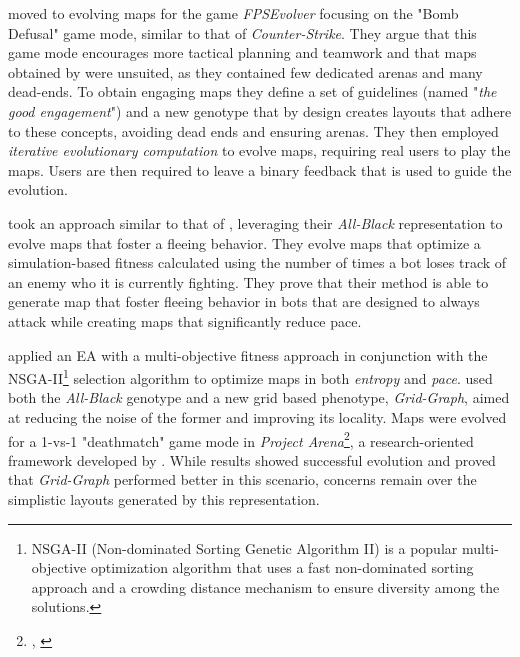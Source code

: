 \documentclass{Configuration_Files/PoliMi3i_thesis}
\begin{document}
 moved to evolving maps for the game \textit{FPSEvolver} focusing on the "Bomb Defusal" game mode, similar to that of \textit{Counter-Strike}. They argue that this game mode encourages more tactical planning and teamwork and that maps obtained by  were unsuited, as they contained few dedicated arenas and many dead-ends. To obtain engaging maps they define a set of guidelines (named "\textit{the good engagement}") and a new genotype that by design creates layouts that adhere to these concepts, avoiding dead ends and ensuring arenas. They then employed \textit{iterative evolutionary computation} to evolve maps, requiring real users to play the maps. Users are then required to leave a binary feedback that is used to guide the evolution. \cite{olsted_interactive_2015}

 took an approach similar to that of , leveraging their \textit{All-Black} representation to evolve maps that foster a fleeing behavior. They evolve maps that optimize a simulation-based fitness calculated using the number of times a bot loses track of an enemy who it is currently fighting. They prove that their method is able to generate map that foster fleeing behavior in bots that are designed to always attack while creating maps that significantly reduce pace. \cite{loiacono_fight_2017}

\citeauthor{bari_evolutionary-based_2023} applied an EA with a multi-objective fitness approach in conjunction with the NSGA-II\footnote{NSGA-II (Non-dominated Sorting Genetic Algorithm II) is a popular multi-objective optimization algorithm that uses a fast non-dominated sorting approach and a crowding distance mechanism to ensure diversity among the solutions.} selection algorithm to optimize maps in both \textit{entropy} and \textit{pace}.  used both the \textit{All-Black} genotype and a new grid based phenotype, \textit{Grid-Graph}, aimed at reducing the noise of the former and improving its locality. Maps were evolved for a 1-vs-1 "deathmatch" game mode in \textit{Project Arena}\footnote{, \citeyear{ballabio_online_2018}}, a research-oriented framework developed by . While results showed successful evolution and proved that \textit{Grid-Graph} performed better in this scenario, concerns remain over the simplistic layouts generated by this representation. \cite{bari_evolutionary-based_2023}
\end{document}
